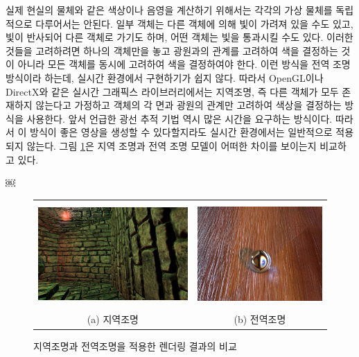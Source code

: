 실제 현실의 물체와 같은 색상이나 음영을 계산하기 위해서는 각각의 가상 물체를 독립적으로 다루어서는 안된다. 일부 객체는 다른 객체에 의해 빛이 가려져 있을 수도 있고, 빛이 반사되어 다른 객체로 가기도 하며, 어떤 객체는 빛을 통과시킬 수도 있다. 이러한 것들을 고려하려면 하나의 객체만을 놓고 광원과의 관계를 고려하여 색을 결정하는 것이 아니라 모든 객체를 동시에 고려하여 색을 결정하여야 한다. 이런 방식을 전역 조명 방식이라 하는데, 실시간 환경에서 구현하기가 쉽지 않다. 따라서 OpenGL이나 DirectX와 같은 실시간 그래픽스 라이브러리에서는 지역조명, 즉 다른 객체가 모두 존재하지 않는다고 가정하고 객체의 각 면과 광원의 관계만 고려하여 색상을 결정하는 방식을 사용한다.
앞서 언급한 광선 추적 기법 역시 많은 시간을 요구하는 방식이다. 따라서 이 방식이 좋은 영상을 생성할 수 있다할지라도 실시간 환경에서는 일반적으로 적용되지 않는다. 
그림 \ref{fig:OGL_intro:localVsGlobalIllumination}은 지역 조명과 전역 조명 모델이 어떠한 차이를 보이는지 비교하고 있다.

￼


\begin{figure}[h!]
  \centering
	\begin{tabular}{cc}
	\includegraphics[height=4cm]{OGL_intro/realtimeEx.png} &    \includegraphics[height=4cm]{OGL_intro/offlineEx.jpg} \\
	(a) 지역조명 & (b) 전역조명
	\end{tabular}
    \caption{지역조명과 전역조명을 적용한 렌더링 결과의 비교}
    \label{fig:OGL_intro:localVsGlobalIllumination}
\end{figure}


